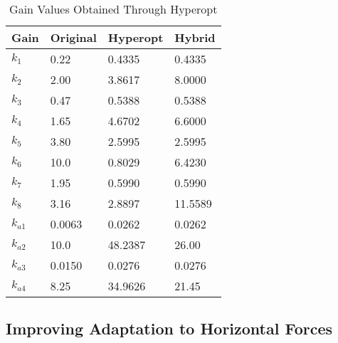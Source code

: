 \documentclass[letterpaper,12pt,titlepage,oneside,final]{book}
\begin{document}
\begin{table}
\caption{Gain Values Obtained Through Hyperopt} \label{table:hyperopt_gains}
\begin{center}
\begin{tabular}{| l | l | l | l |}

\hline
\textbf{Gain} & \textbf{Original} & \textbf{Hyperopt} & \textbf{Hybrid} \\ \hline
$k_{1}$ & 0.22 & 0.4335 & 0.4335 \\ \hline
$k_{2}$ & 2.00 & 3.8617 & 8.0000 \\ \hline
$k_{3}$ & 0.47 & 0.5388 & 0.5388 \\ \hline
$k_{4}$ & 1.65 & 4.6702 & 6.6000 \\ \hline
$k_{5}$ & 3.80 & 2.5995 & 2.5995 \\ \hline 
$k_{6}$ & 10.0 & 0.8029 & 6.4230 \\ \hline 
$k_{7}$ & 1.95 & 0.5990 & 0.5990 \\ \hline 
$k_{8}$ & 3.16 & 2.8897 & 11.5589 \\ \hline 
$k_{a1}$ & 0.0063 & 0.0262 & 0.0262 \\ \hline 
$k_{a2}$ & 10.0 & 48.2387 & 26.00 \\ \hline 
$k_{a3}$ & 0.0150 & 0.0276 & 0.0276 \\ \hline 
$k_{a4}$ & 8.25 & 34.9626 & 21.45 \\ \hline 


\end{tabular}
\end{center}
\end{table}




\subsection{Improving Adaptation to Horizontal Forces}
\end{document}
